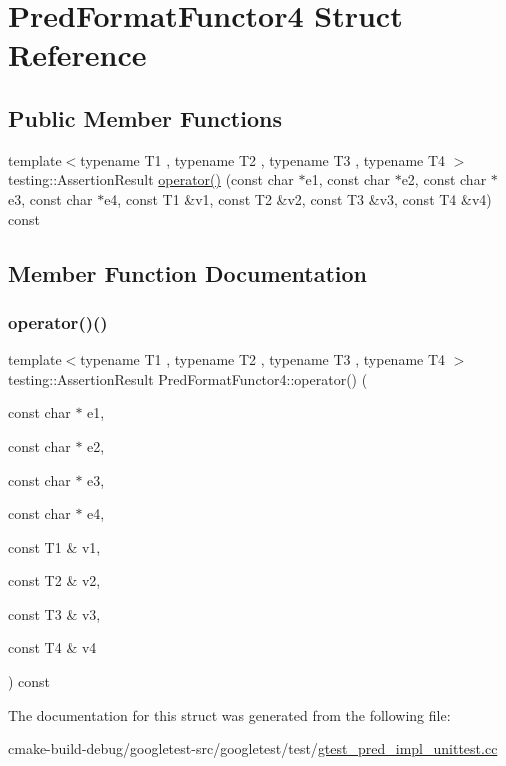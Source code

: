 \hypertarget{structPredFormatFunctor4}{}\section{Pred\+Format\+Functor4 Struct Reference}
\label{structPredFormatFunctor4}
\subsection*{Public Member Functions}
\begin{DoxyCompactItemize}
\item 
{\footnotesize template$<$typename T1 , typename T2 , typename T3 , typename T4 $>$ }\\testing\+::\+Assertion\+Result \mbox{\hyperlink{structPredFormatFunctor4_a97061d2b9eadf357f4e50a75f5a9af5b}{operator()}} (const char $\ast$e1, const char $\ast$e2, const char $\ast$e3, const char $\ast$e4, const T1 \&v1, const T2 \&v2, const T3 \&v3, const T4 \&v4) const
\end{DoxyCompactItemize}


\subsection{Member Function Documentation}
\mbox{\label{structPredFormatFunctor4_a97061d2b9eadf357f4e50a75f5a9af5b}} 
\subsubsection{\texorpdfstring{operator()()}{operator()()}}
{\footnotesize\ttfamily template$<$typename T1 , typename T2 , typename T3 , typename T4 $>$ \\
testing\+::\+Assertion\+Result Pred\+Format\+Functor4\+::operator() (\begin{DoxyParamCaption}\item[{const char $\ast$}]{e1,  }\item[{const char $\ast$}]{e2,  }\item[{const char $\ast$}]{e3,  }\item[{const char $\ast$}]{e4,  }\item[{const T1 \&}]{v1,  }\item[{const T2 \&}]{v2,  }\item[{const T3 \&}]{v3,  }\item[{const T4 \&}]{v4 }\end{DoxyParamCaption}) const\hspace{0.3cm}{\ttfamily [inline]}}



The documentation for this struct was generated from the following file\+:\begin{DoxyCompactItemize}
\item 
cmake-\/build-\/debug/googletest-\/src/googletest/test/\mbox{\hyperlink{gtest__pred__impl__unittest_8cc}{gtest\+\_\+pred\+\_\+impl\+\_\+unittest.\+cc}}\end{DoxyCompactItemize}
